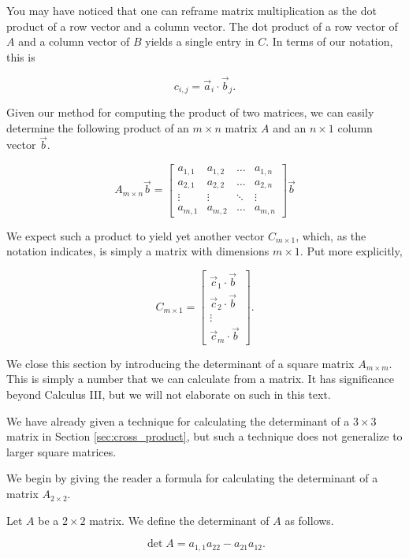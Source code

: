 You may have noticed that one can reframe matrix multiplication as the dot product of a row vector and a column vector.  The dot product of a row vector of $A$ and a column vector of $B$ yields a single entry in $C$.  In terms of our notation, this is 

\[ c_{i,j} = \vec{a}_i \cdot\vec{b}_j.\]

Given our method for computing the product of two matrices, we can easily determine the following product of an $m\times n$ matrix $A$ and an $n\times 1$ column vector $\vec b$.

\[
	A_{m\times n}\vec{b} =
	\begin{bmatrix}
		a_{1,1} & a_{1,2} & \dots & a_{1,n}\\
		a_{2,1} & a_{2,2} &\dots & a_{2,n}\\
		\vdots & \vdots &\ddots&  \vdots \\
		a_{m,1} & a_{m,2}  & \dots  & a_{m,n}
	\end{bmatrix}
	\vec{b}
\]

We expect such a product to yield yet another vector $C_{m\times 1}$, which, as the notation indicates, is simply a matrix with dimensions $m\times 1$.  Put more explicitly, 

\[C_{m\times 1} = 
\begin{bmatrix}
	\vec{c}_1 \cdot \vec b\\
	\vec{c}_2 \cdot \vec b\\
	\vdots \\
	\vec{c}_m \cdot \vec b
\end{bmatrix}.
\]

We close this section by  introducing the determinant of a square matrix $A_{m\times m}$.  This is simply a number that we can calculate from  a matrix.  It has significance beyond Calculus III, but we will not elaborate on such in this text.  

We have already given a technique for calculating the determinant of a $3\times 3$ matrix in Section \ref{sec:cross_product}, but such a technique does not generalize to larger square matrices.  

We begin by giving the reader a formula for calculating the determinant of a matrix $A_{2\times 2}$.

{Let $A$ be a $2\times 2$ matrix.  We define the determinant of $A$ as follows.

\[\det A = a_{1,1}a_{22} - a_{21}a_{12}.\]
}

